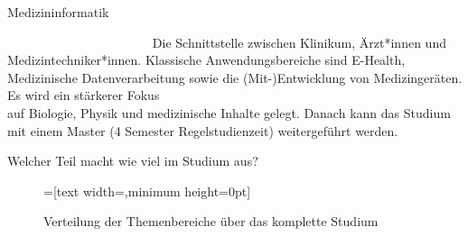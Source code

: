 
\begin{Huge}
    Medizininformatik
\end{Huge}

\begin{exampleblock}{\textcolor{white}{Was ist der Studiengang?}}
    Die Schnittstelle zwischen Klinikum, Ärzt*innen und Medizintechniker*innen. Klassische Anwendungsbereiche sind E-Health, Medizinische Datenverarbeitung sowie die (Mit-)Entwicklung von Medizingeräten. Es wird ein stärkerer Fokus \\  auf Biologie, Physik und medizinische Inhalte gelegt. Danach kann das Studium mit einem Master (4 Semester Regelstudienzeit) weitergeführt werden.
\end{exampleblock}

\begin{block}{Welcher Teil macht wie viel im Studium aus?}
    \begin{figure}[h!]
        \vspace{-20pt}
        \begin{minipage}{\linewidth}
            \centering
            =[text width={},minimum height=0pt]
        \end{minipage}
        \vspace{-20pt}
        \caption{Verteilung der Themenbereiche über das komplette Studium}
    \end{figure}
\end{block}

